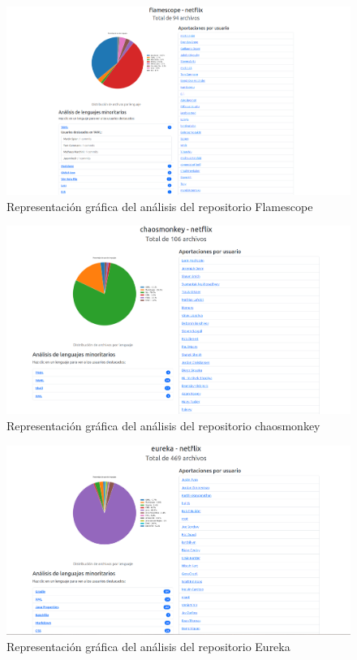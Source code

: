 \documentclass[a4paper, 12pt]{book}
\begin{document}
\begin{figure}[H]
  \centering
  \includegraphics[width=1\textwidth]{img/flamescope.png}
  \caption{Representación gráfica del análisis del repositorio Flamescope}
  \label{figura:analisisflamescope}
\end{figure}
\begin{figure}[H]
  \centering
  \includegraphics[width=1\textwidth]{img/chaosmonkey.png}
  \caption{Representación gráfica del análisis del repositorio chaosmonkey}
  \label{figura:analisischaosmonkey}
\end{figure}
\begin{figure}[H]
  \centering
  \includegraphics[width=1\textwidth]{img/eureka.png}
  \caption{Representación gráfica del análisis del repositorio Eureka}
  \label{figura:analisiseureka}
\end{figure}
\end{document}
